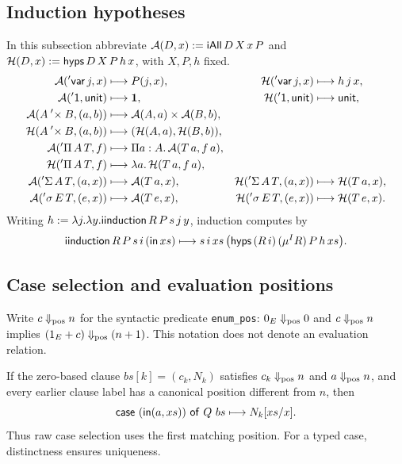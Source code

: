\subsection{Induction hypotheses}
In this subsection abbreviate $\mathcal A(D,x):=\mathsf{iAll}\,D\,X\,x\,P$ and $\mathcal H(D,x):=\mathsf{hyps}\,D\,X\,P\,h\,x$, with $X,P,h$ fixed.
\begin{align*}
\mathcal A(\mathsf{'var}\,j,x)&\longmapsto P(j,x),&
\mathcal H(\mathsf{'var}\,j,x)&\longmapsto h\,j\,x,\\
\mathcal A(\mathsf{'1},\mathsf{unit})&\longmapsto\mathbf1,&
\mathcal H(\mathsf{'1},\mathsf{unit})&\longmapsto\mathsf{unit},\\
\mathcal A(A\mathbin{'\times}B,(a,b))&\longmapsto\mathcal A(A,a)\times\mathcal A(B,b),\\
\mathcal H(A\mathbin{'\times}B,(a,b))&\longmapsto(\mathcal H(A,a),\mathcal H(B,b)),\\
\mathcal A('\Pi\,A\,T,f)&\longmapsto\Pi a:A.\,\mathcal A(T\,a,f\,a),\\
\mathcal H('\Pi\,A\,T,f)&\longmapsto\lambda a.\,\mathcal H(T\,a,f\,a),\\
\mathcal A('\Sigma\,A\,T,(a,x))&\longmapsto\mathcal A(T\,a,x),&
\mathcal H('\Sigma\,A\,T,(a,x))&\longmapsto\mathcal H(T\,a,x),\\
\mathcal A('\sigma\,E\,T,(e,x))&\longmapsto\mathcal A(T\,e,x),&
\mathcal H('\sigma\,E\,T,(e,x))&\longmapsto\mathcal H(T\,e,x).
\end{align*}
Writing $h:=\lambda j.\lambda y.\mathsf{iinduction}\,R\,P\,s\,j\,y$, induction computes by
\[
 \mathsf{iinduction}\,R\,P\,s\,i\,(\mathsf{in}\,xs)
 \longmapsto s\,i\,xs\,
 \bigl(\mathsf{hyps}\,(R\,i)\,(\mu^I R)\,P\,h\,xs\bigr).
\]
\subsection{Case selection and evaluation positions}
Write $c\Downarrow_{\rm pos}n$ for the syntactic predicate \texttt{enum\_pos}: $0_E\Downarrow_{\rm pos}0$ and $c\Downarrow_{\rm pos}n$ implies $(1_E+c)\Downarrow_{\rm pos}(n+1)$. This notation does not denote an evaluation relation.

If the zero-based clause $bs[k]=(c_k,N_k)$ satisfies $c_k\Downarrow_{\rm pos}n$ and $a\Downarrow_{\rm pos}n$, and every earlier clause label has a canonical position different from $n$, then
\[
 \op{case}\ (\op{in}(a,xs))\ \op{of}\ Q\ bs
 \longmapsto N_k[xs/x].
\]
Thus raw case selection uses the first matching position. For a typed case, distinctness ensures uniqueness.

